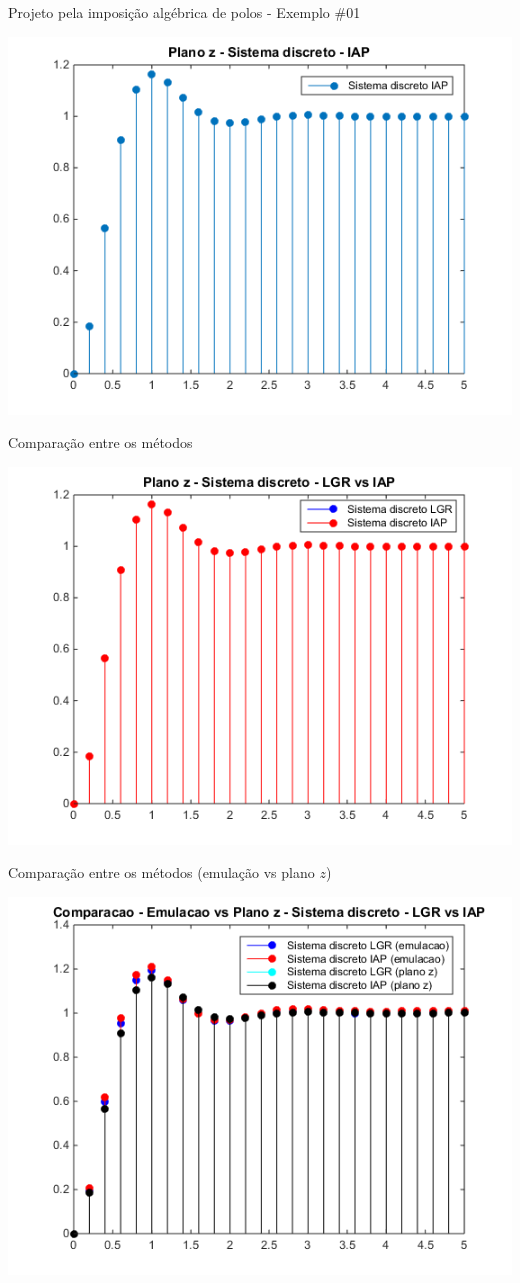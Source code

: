 \begin{frame}{Projeto pela imposição algébrica de polos - Exemplo \#01}
\centerline{\includegraphics[width=0.8\linewidth]{Figuras/Ch11/fig12.png}}
\end{frame}

\begin{frame}{Comparação entre os métodos}
\centerline{\includegraphics[width=0.8\linewidth]{Figuras/Ch11/fig13.png}}
\end{frame}

\begin{frame}{Comparação entre os métodos (emulação vs plano $z$)}
\centerline{\includegraphics[width=0.8\linewidth]{Figuras/Ch11/fig14.png}}
\end{frame}

